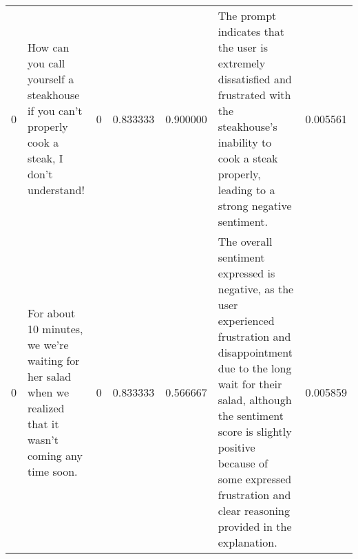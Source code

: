 \begin{tabular}{rlrrrlr}
0 & How can you call yourself a steakhouse if you can't properly cook a steak, I don't understand! & 0 & 0.833333 & 0.900000 & The prompt indicates that the user is extremely dissatisfied and frustrated with the steakhouse's inability to cook a steak properly, leading to a strong negative sentiment. & 0.005561 \\
0 & For about 10 minutes, we we're waiting for her salad when we realized that it wasn't coming any time soon. & 0 & 0.833333 & 0.566667 & The overall sentiment expressed is negative, as the user experienced frustration and disappointment due to the long wait for their salad, although the sentiment score is slightly positive because of some expressed frustration and clear reasoning provided in the explanation. & 0.005859 \\
\bottomrule
\end{tabular}
